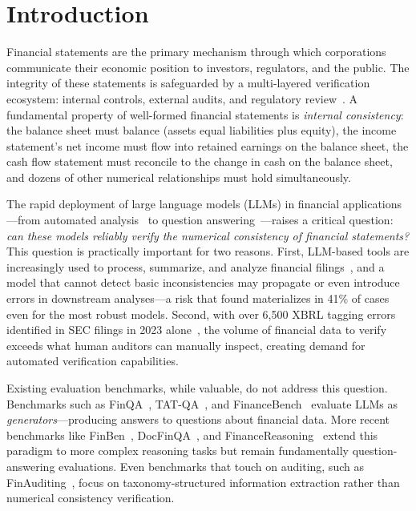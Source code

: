 \documentclass[11pt]{article}
\begin{document}
\section{Introduction}
\label{sec:intro}

Financial statements are the primary mechanism through which corporations communicate their economic position to investors, regulators, and the public.
The integrity of these statements is safeguarded by a multi-layered verification ecosystem: internal controls, external audits, and regulatory review~\citep{auditllm2025}.
A fundamental property of well-formed financial statements is \emph{internal consistency}: the balance sheet must balance (assets equal liabilities plus equity), the income statement's net income must flow into retained earnings on the balance sheet, the cash flow statement must reconcile to the change in cash on the balance sheet, and dozens of other numerical relationships must hold simultaneously.

The rapid deployment of large language models (LLMs) in financial applications---from automated analysis~\citep{wu2023bloomberggpt} to question answering~\citep{chen2021finqa, islam2023financebench}---raises a critical question: \emph{can these models reliably verify the numerical consistency of financial statements?}
This question is practically important for two reasons.
First, LLM-based tools are increasingly used to process, summarize, and analyze financial filings~\citep{lin2026openfinllm}, and a model that cannot detect basic inconsistencies may propagate or even introduce errors in downstream analyses---a risk that \citet{failsafeqa2025} found materializes in 41\% of cases even for the most robust models.
Second, with over 6,500 XBRL tagging errors identified in SEC filings in 2023 alone~\citep{fintagging2025}, the volume of financial data to verify exceeds what human auditors can manually inspect, creating demand for automated verification capabilities.

Existing evaluation benchmarks, while valuable, do not address this question.
Benchmarks such as FinQA~\citep{chen2021finqa}, TAT-QA~\citep{zhu2021tatqa}, and FinanceBench~\citep{islam2023financebench} evaluate LLMs as \emph{generators}---producing answers to questions about financial data.
More recent benchmarks like FinBen~\citep{xie2024finben}, DocFinQA~\citep{reddy2024docfinqa}, and FinanceReasoning~\citep{tang2025financereasoning} extend this paradigm to more complex reasoning tasks but remain fundamentally question-answering evaluations.
Even benchmarks that touch on auditing, such as FinAuditing~\citep{wang2025finauditing}, focus on taxonomy-structured information extraction rather than numerical consistency verification.
\end{document}
